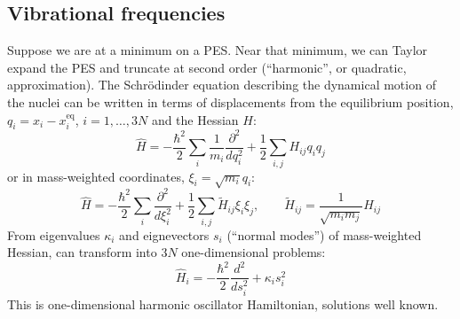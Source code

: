 \documentclass[11pt]{article}
\begin{document}
\subsection{Vibrational frequencies}
\label{sec:org3631949}
Suppose we are at a minimum on a PES.  Near that minimum, we can Taylor expand the PES and truncate at second order (``harmonic'', or quadratic, approximation).  The Schr\"{o}dinder equation describing the dynamical motion of the nuclei can be written in terms of displacements from the equilibrium position, \(q_i = x_i - x^\text{eq}_i\), \(i =1, \ldots, 3N\) and the Hessian \(H\):
\[\hat{H} = -\frac{\hbar^2}{2}\sum_i \frac{1}{m_i}\frac{\partial^2}{dq_i^2}+\frac{1}{2}\sum_{i,j} H_{ij} q_i q_j\]
or in mass-weighted coordinates, \(\xi_i=\sqrt{m_i}q_i\):
\[ \hat{H} = -\frac{\hbar^2}{2}\sum_i \frac{\partial^2}{d\xi_i^2}+\frac{1}{2}\sum_{i,j} \tilde{H}_{ij} \xi_i \xi_j,\qquad \tilde{H}_{ij}=\frac{1}{\sqrt{m_i m_j}}H_{ij} \]
From eigenvalues \(\kappa_i\) and eignevectors \(s_i\) (``normal modes'') of mass-weighted Hessian, can transform into \(3N\) one-dimensional problems:
\[\hat{H}_i=-\frac{\hbar^2}{2}\frac{d^2}{ds_i^2}+\kappa_is_i^2\]
This is one-dimensional harmonic oscillator Hamiltonian, solutions well known.
\end{document}
